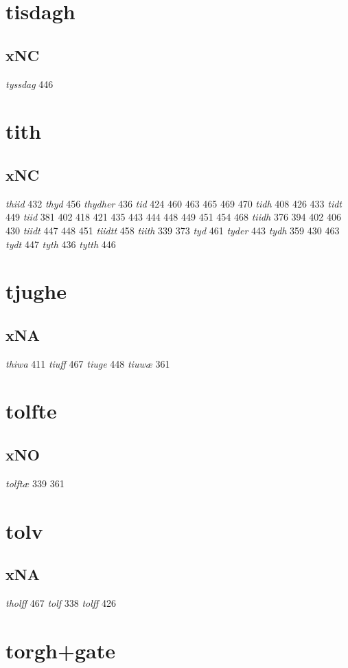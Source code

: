 \documentclass[a4paper,twocolumn]{article}
\begin{document}
\section{tisdagh}
\label{sec:orgd4f9039}
\subsection{xNC}
\label{sec:orgcdd7586}
\emph{tyssdag} 446 
\section{tith}
\label{sec:org500a1d0}
\subsection{xNC}
\label{sec:orgea5742c}
\emph{thiid} 432 \emph{thyd} 456 \emph{thydher} 436 \emph{tid} 424 460 463 465 469 470 \emph{tidh} 408 426 433 \emph{tidt} 449 \emph{tiid} 381 402 418 421 435 443 444 448 449 451 454 468 \emph{tiidh} 376 394 402 406 430 \emph{tiidt} 447 448 451 \emph{tiidtt} 458 \emph{tiith} 339 373 \emph{tyd} 461 \emph{tyder} 443 \emph{tydh} 359 430 463 \emph{tydt} 447 \emph{tyth} 436 \emph{tytth} 446 
\section{tjughe}
\label{sec:org8dd55f4}
\subsection{xNA}
\label{sec:org3a997ae}
\emph{thiwa} 411 \emph{tiuff} 467 \emph{tiuge} 448 \emph{tiuwæ} 361 
\section{tolfte}
\label{sec:org5db0113}
\subsection{xNO}
\label{sec:org08139ae}
\emph{tolftæ} 339 361 
\section{tolv}
\label{sec:org8f330a4}
\subsection{xNA}
\label{sec:orge46bbdd}
\emph{tholff} 467 \emph{tolf} 338 \emph{tolff} 426 
\section{torgh+gate}
\label{sec:orgf810e52}
\end{document}
